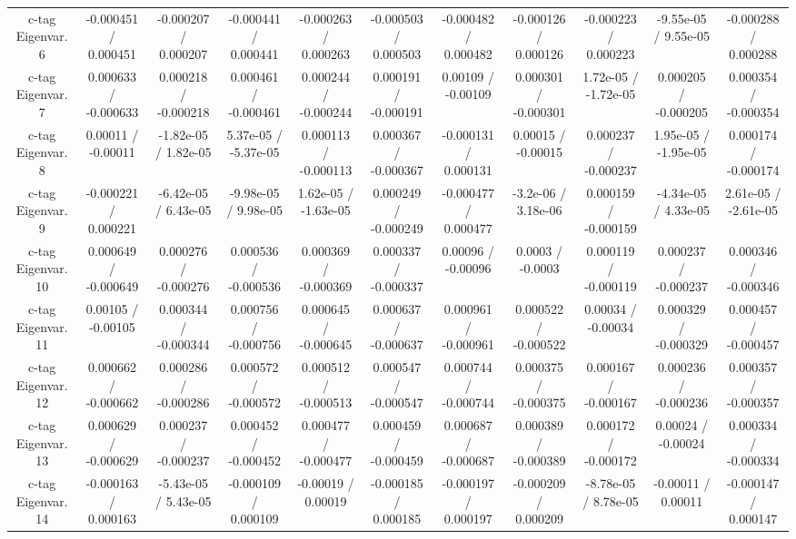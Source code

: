 \begin{table}[htbp]
\begin{center}
\begin{tabular}{|c|c|c|c|c|c|c|c|c|c|c|}
  c-tag Eigenvar. 6 & -0.000451 / 0.000451 & -0.000207 / 0.000207 & -0.000441 / 0.000441 & -0.000263 / 0.000263 & -0.000503 / 0.000503 & -0.000482 / 0.000482 & -0.000126 / 0.000126 & -0.000223 / 0.000223 & -9.55e-05 / 9.55e-05 & -0.000288 / 0.000288 \\ 
  c-tag Eigenvar. 7 & 0.000633 / -0.000633 & 0.000218 / -0.000218 & 0.000461 / -0.000461 & 0.000244 / -0.000244 & 0.000191 / -0.000191 & 0.00109 / -0.00109 & 0.000301 / -0.000301 & 1.72e-05 / -1.72e-05 & 0.000205 / -0.000205 & 0.000354 / -0.000354 \\ 
  c-tag Eigenvar. 8 & 0.00011 / -0.00011 & -1.82e-05 / 1.82e-05 & 5.37e-05 / -5.37e-05 & 0.000113 / -0.000113 & 0.000367 / -0.000367 & -0.000131 / 0.000131 & 0.00015 / -0.00015 & 0.000237 / -0.000237 & 1.95e-05 / -1.95e-05 & 0.000174 / -0.000174 \\ 
  c-tag Eigenvar. 9 & -0.000221 / 0.000221 & -6.42e-05 / 6.43e-05 & -9.98e-05 / 9.98e-05 & 1.62e-05 / -1.63e-05 & 0.000249 / -0.000249 & -0.000477 / 0.000477 & -3.2e-06 / 3.18e-06 & 0.000159 / -0.000159 & -4.34e-05 / 4.33e-05 & 2.61e-05 / -2.61e-05 \\ 
  c-tag Eigenvar. 10 & 0.000649 / -0.000649 & 0.000276 / -0.000276 & 0.000536 / -0.000536 & 0.000369 / -0.000369 & 0.000337 / -0.000337 & 0.00096 / -0.00096 & 0.0003 / -0.0003 & 0.000119 / -0.000119 & 0.000237 / -0.000237 & 0.000346 / -0.000346 \\ 
  c-tag Eigenvar. 11 & 0.00105 / -0.00105 & 0.000344 / -0.000344 & 0.000756 / -0.000756 & 0.000645 / -0.000645 & 0.000637 / -0.000637 & 0.000961 / -0.000961 & 0.000522 / -0.000522 & 0.00034 / -0.00034 & 0.000329 / -0.000329 & 0.000457 / -0.000457 \\ 
  c-tag Eigenvar. 12 & 0.000662 / -0.000662 & 0.000286 / -0.000286 & 0.000572 / -0.000572 & 0.000512 / -0.000513 & 0.000547 / -0.000547 & 0.000744 / -0.000744 & 0.000375 / -0.000375 & 0.000167 / -0.000167 & 0.000236 / -0.000236 & 0.000357 / -0.000357 \\ 
  c-tag Eigenvar. 13 & 0.000629 / -0.000629 & 0.000237 / -0.000237 & 0.000452 / -0.000452 & 0.000477 / -0.000477 & 0.000459 / -0.000459 & 0.000687 / -0.000687 & 0.000389 / -0.000389 & 0.000172 / -0.000172 & 0.00024 / -0.00024 & 0.000334 / -0.000334 \\ 
  c-tag Eigenvar. 14 & -0.000163 / 0.000163 & -5.43e-05 / 5.43e-05 & -0.000109 / 0.000109 & -0.00019 / 0.00019 & -0.000185 / 0.000185 & -0.000197 / 0.000197 & -0.000209 / 0.000209 & -8.78e-05 / 8.78e-05 & -0.00011 / 0.00011 & -0.000147 / 0.000147 \\ 

\end{tabular}
\end{center}
\end{table}
